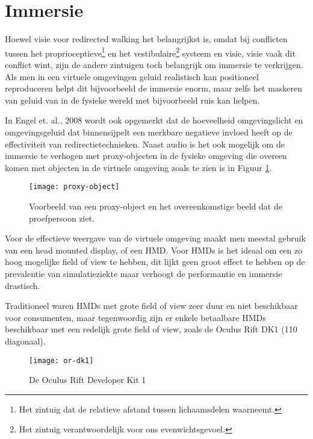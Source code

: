 \section{Immersie}
Hoewel visie voor redirected walking het belangrijkst is, omdat bij conflicten
tussen het proprioceptieve\footnote{Het zintuig dat de relatieve afstand tussen
lichaamsdelen waarneemt.} en het vestibulaire\footnote{Het zintuig 
verantwoordelijk voor ons evenwichtsgevoel.} systeem en visie, visie vaak dit
conflict wint\cite{berthoz02,dichgans78,bruder08}, zijn de andere zintuigen toch
belangrijk om immersie te verkrijgen. Als men in een virtuele omgevingen geluid 
realistisch kan positioneel reproduceren helpt dit bijvoorbeeld de immersie 
enorm\cite{lackner77}, maar zelfs het maskeren van geluid van in de fysieke 
wereld met bijvoorbeeld ruis kan helpen\cite{usoh99}.

In Engel et. al., 2008\cite{engel08} wordt ook opgemerkt dat de hoeveelheid 
omgevingslicht en omgevingsgeluid dat binnensijpelt een merkbare negatieve 
invloed heeft op de effectiviteit van redirectietechnieken. Naast audio is het 
ook mogelijk om de immersie te verhogen met proxy-objecten in de fysieke 
omgeving die overeen komen met objecten in de virtuele omgeving\cite{steinicke09}
zoals te zien is in Figuur \ref{fig:proxy-object}.

\begin{figure}[h!]
    \centering
    \texttt{[image: proxy-object]}
    \caption{Voorbeeld van een proxy-object en het overeenkomstige beeld dat de
    proefpersoon ziet.\cite{steinicke09}}
    \label{fig:proxy-object}
\end{figure}

Voor de effectieve weergave van de virtuele omgeving maakt men meestal gebruik 
van een head mounted display, of een HMD. Voor HMDs is het ideaal om een zo hoog 
mogelijke field of view te hebben, dit lijkt geen groot effect te hebben op de 
prevalentie van simulatieziekte\cite{arthur00} maar verhoogt de performantie en 
immersie drastisch\cite{arthur00}.

Traditioneel waren HMDs met grote field of view zeer duur en niet beschikbaar voor
consumenten, maar tegenwoordig zijn er enkele betaalbare HMDs beschikbaar met een
redelijk grote field of view, zoals de Oculus Rift DK1 (110\textdegree{} 
diagonaal).

\begin{figure}[h!]
    \centering
    \texttt{[image: or-dk1]}
    \caption{De Oculus Rift Developer Kit 1}
    \label{fig:or-dk1}
\end{figure}

